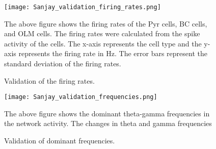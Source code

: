 \begin{figure}[htbp]
    \centering
    \texttt{[image: Sanjay\_validation\_firing\_rates.png]}
    \caption[Validation of the firing rates]{Validation of the firing rates.}\label{fig:validation_firing_rates}
    \begin{minipage}{0.9\textwidth}
        The above figure shows the firing rates of the Pyr cells, BC cells, and OLM cells. The firing rates were calculated from the spike activity of the cells. The x-axis represents the cell type and the y-axis represents the firing rate in Hz. The error bars represent the standard deviation of the firing rates.
    \end{minipage}
\end{figure}

\begin{figure}[htbp]
    \centering
    \texttt{[image: Sanjay\_validation\_frequencies.png]}
    \caption[Validation of the firing rates]{Validation of dominant frequencies.}\label{fig:validation_frequencies}
    \begin{minipage}{0.9\textwidth}
        The above figure shows the dominant theta-gamma frequencies in the network activity. The changes in theta and gamma frequencies
    \end{minipage}
\end{figure}

